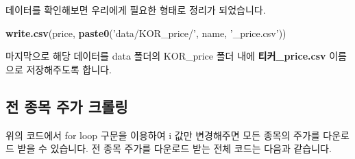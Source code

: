 \documentclass[12pt,]{book}
\newenvironment{Shaded}{\begin{snugshade}}{\end{snugshade}}
\newcommand{\KeywordTok}[1]{\textcolor[rgb]{0.13,0.29,0.53}{\textbf{#1}}}
\newcommand{\NormalTok}[1]{#1}
\newcommand{\StringTok}[1]{\textcolor[rgb]{0.31,0.60,0.02}{#1}}
\begin{document}
데이터를 확인해보면 우리에게 필요한 형태로 정리가 되었습니다.

\begin{Shaded}
\begin{Highlighting}[]
\KeywordTok{write.csv}\NormalTok{(price, }\KeywordTok{paste0}\NormalTok{(}\StringTok{'data/KOR_price/'}\NormalTok{, name,}
                        \StringTok{'_price.csv'}\NormalTok{))}
\end{Highlighting}
\end{Shaded}

마지막으로 해당 데이터를 data 폴더의 KOR\_price 폴더 내에 \textbf{티커\_price.csv} 이름으로 저장해주도록 합니다.

\hypertarget{section-26}{%
\subsection{전 종목 주가 크롤링}\label{section-26}}

위의 코드에서 for loop 구문을 이용하여 i 값만 변경해주면 모든 종목의 주가를 다운로드 받을 수 있습니다. 전 종목 주가를 다운로드 받는 전체 코드는 다음과 같습니다.
\end{document}
